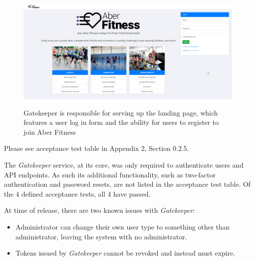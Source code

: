 \begin{figure}[H]
    \centering
    \includegraphics[width=\textwidth]{Images/service_landing_page.png}
    \caption{Gatekeeper is responsible for serving up the landing page, which features a user log in form and the ability for users to register to join Aber Fitness}
\end{figure}

Please see acceptance test table in Appendix 2, Section 0.2.5.

The \textit{Gatekeeper} service, at its core, was only required to authenticate users and API endpoints. As such its additional functionality, such as two-factor authentication and password resets, are not listed in the acceptance test table. Of the 4 defined acceptance tests, all 4 have passed.

At time of release, there are two known issues with \textit{Gatekeeper}: 

\begin{itemize}
	\item Administrator can change their own user type to something other than administrator, leaving the system with no administrator.
	\item Tokens issued by \textit{Gatekeeper} cannot be revoked and instead must expire.
\end{itemize}